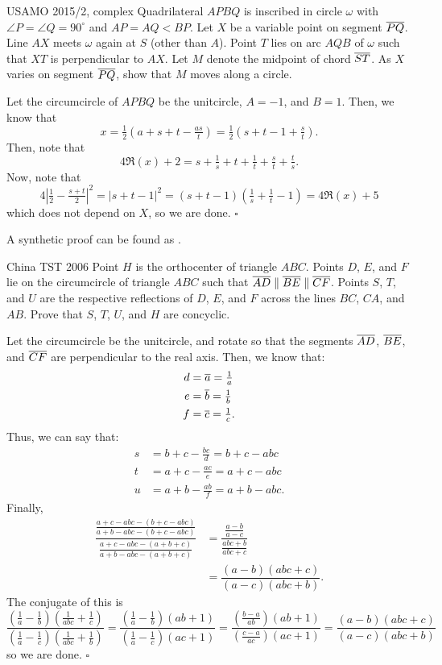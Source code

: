 \documentclass{article}
\begin{document}
\begin{problem}[6.35]{USAMO 2015/2, complex}
Quadrilateral $APBQ$ is inscribed in circle $\omega$ with $\angle P = \angle Q = 90^\circ$ and $AP = AQ < BP$. Let $X$ be a variable point on segment $\overline{PQ}$. Line $AX$ meets $\omega$ again at $S$ (other than $A$). Point $T$ lies on arc $AQB$ of $\omega$ such that $XT$ is perpendicular to $AX$. Let $M$ denote the midpoint of chord $\overline{ST}$. As $X$ varies on segment $\overline{PQ}$, show that $M$ moves along a circle.
\end{problem}

Let the circumcircle of $APBQ$ be the unitcircle, $A = -1$, and $B = 1$. Then, we know that \[x = \tfrac{1}{2}(a+s+t-\tfrac{as}{t}) = \tfrac{1}{2}(s+t-1+\tfrac{s}{t}).\] Then, note that \[4\Re(x)+2 = s+\tfrac{1}{s}+t+\tfrac{1}{t}+\tfrac{s}{t}+\tfrac{t}{s}.\] Now, note that \[4\left|\tfrac{1}{2}-\tfrac{s+t}{2}\right|^2 = |s+t-1|^2 = (s+t-1)\left(\tfrac{1}{s}+\tfrac{1}{t}-1\right) = 4\Re(x)+5\] which does not depend on $X$, so we are done. $\square$

\begin{remark*}
A synthetic proof can be found as .
\end{remark*}

\begin{problem}[6.36]{China TST 2006}
Point $H$ is the orthocenter of triangle $ABC$. Points $D$, $E$, and $F$ lie on the circumcircle of triangle $ABC$ such that $\overline{AD} \parallel \overline{BE} \parallel \overline{CF}$. Points $S$, $T$, and $U$ are the respective reflections of $D$, $E$, and $F$ across the lines $BC$, $CA$, and $AB$. Prove that $S$, $T$, $U$, and $H$ are concyclic.
\end{problem}

Let the circumcircle be the unitcircle, and rotate so that the segments $\overline{AD}$, $\overline{BE}$, and $\overline{CF}$ are perpendicular to the real axis. Then, we know that:
\begin{align*}
d &= \overline{a} = \tfrac{1}{a} \\
e &= \overline{b} = \tfrac{1}{b} \\
f &= \overline{c} = \tfrac{1}{c}.
\end{align*}
Thus, we can say that:
\begin{align*}
s &= b+c-\tfrac{bc}{d} = b+c-abc \\
t &= a+c-\tfrac{ac}{e} = a+c-abc\\
u &= a+b-\tfrac{ab}{f} = a+b-abc.
\end{align*}
Finally,
\begin{align*}
\dfrac{\tfrac{a+c-abc-(b+c-abc)}{a+b-abc-(b+c-abc)}}{\tfrac{a+c-abc-(a+b+c)}{a+b-abc-(a+b+c)}} &= \dfrac{\tfrac{a-b}{a-c}}{\tfrac{abc+b}{abc+c}} \\
&= \dfrac{(a-b)(abc+c)}{(a-c)(abc+b)}.
\end{align*}
The conjugate of this is \[\dfrac{\left(\tfrac{1}{a}-\tfrac{1}{b}\right)\left(\tfrac{1}{abc}+\tfrac{1}{c}\right)}{\left(\tfrac{1}{a}-\tfrac{1}{c}\right)\left(\tfrac{1}{abc}+\tfrac{1}{b}\right)} = \dfrac{\left(\tfrac{1}{a}-\tfrac{1}{b}\right)(ab+1)}{\left(\tfrac{1}{a}-\tfrac{1}{c}\right)(ac+1)} = \dfrac{\left(\tfrac{b-a}{ab}\right)(ab+1)}{\left(\tfrac{c-a}{ac}\right)(ac+1)} = \dfrac{(a-b)(abc+c)}{(a-c)(abc+b)}\] so we are done. $\square$
\end{document}
